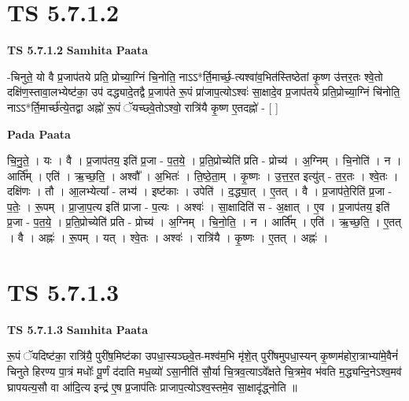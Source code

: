 \documentclass[17pt]{extarticle}
\begin{document}

\section{ TS 5.7.1.2 }

\textbf{TS 5.7.1.2 } \newline
\textbf{Samhita Paata} \newline

-चिनुते॒ यो वै प्र॒जाप॑तये प्रति॒ प्रोच्या॒ग्निं चि॒नोति॒ नाऽऽ*र्ति॒मार्च्छ॒-त्यश्वा॑व॒भित॑स्तिष्ठेतां कृ॒ष्ण उ॑त्तर॒तः श्वे॒तो दक्षि॑ण॒स्तावा॒लभ्येष्ट॑का॒ उप॑ दद्ध्यादे॒तद्वै प्र॒जाप॑ते रू॒पं प्रा॑जाप॒त्योऽश्वः॑ सा॒क्षादे॒व प्र॒जाप॑तये प्रति॒प्रोच्या॒ग्निं चि॑नोति॒ नाऽऽ*र्ति॒मार्च्छ॑त्ये॒तद्वा अह्नो॑ रू॒पं ॅयच्छ्वे॒तोऽश्वो॒ रात्रि॑यै कृ॒ष्ण ए॒तदह्नो॑ - [  ] \newline

\textbf{Pada Paata} \newline

चि॒नु॒ते॒ । यः । वै । प्र॒जाप॑तय॒ इति॑ प्र॒जा -  प॒त॒ये॒ । प्र॒ति॒प्रोच्येति॑ प्रति - प्रोच्य॑ । अ॒ग्निम् । चि॒नोति॑ । न । आर्ति᳚म् । एति॑ । ऋ॒च्छ॒ति॒ । अश्वौ᳚ । अ॒भितः॑ । ति॒ष्ठे॒ता॒म् । कृ॒ष्णः । उ॒त्त॒र॒त इत्यु॑त् -   त॒र॒तः । श्वे॒तः । दक्षि॑णः । तौ । आ॒लभ्येत्या᳚ - लभ्य॑ । इष्ट॑काः । उपेति॑ । द॒द्ध्या॒त् । ए॒तत् । वै । प्र॒जाप॑ते॒रिति॑ प्र॒जा - प॒तेः॒ । रू॒पम् । प्रा॒जा॒प॒त्य इति॑ प्राजा - प॒त्यः । अश्वः॑ । सा॒क्षादिति॑ स - अ॒क्षात् । ए॒व । प्र॒जाप॑तय॒ इति॑ प्र॒जा - प॒त॒ये॒ । प्र॒ति॒प्रोच्येति॑ प्रति - प्रोच्य॑ । अ॒ग्निम् । चि॒नो॒ति॒ । न । आर्ति᳚म् । एति॑ । ऋ॒च्छ॒ति॒ । ए॒तत् । वै । अह्नः॑ । रू॒पम् । यत् । श्वे॒तः । अश्वः॑ । रात्रि॑यै । कृ॒ष्णः । ए॒तत् । अह्नः॑ ।  \newline





\section{ TS 5.7.1.3 }

\textbf{TS 5.7.1.3 } \newline
\textbf{Samhita Paata} \newline

रू॒पं ॅयदिष्ट॑का॒ रात्रि॑यै॒ पुरी॑ष॒मिष्ट॑का उपधा॒स्यञ्छ्वे॒त-मश्व॑म॒भि मृ॑शे॒त् पुरी॑षमुपधा॒स्यन् कृ॒ष्णम॑होरा॒त्राभ्या॑मे॒वैनं॑ चिनुते हिरण्य पा॒त्रं मधोः᳚ पू॒र्णं द॑दाति मध॒व्यो॑ ऽसा॒नीति॑ सौ॒र्या चि॒त्रव॒त्याऽवे᳚क्षते चि॒त्रमे॒व भ॑वति म॒द्ध्यन्दि॒नेऽश्व॒मव॑ घ्रापयत्य॒सौ वा आ॑दि॒त्य इन्द्र॑ ए॒ष प्र॒जाप॑तिः प्राजाप॒त्योऽश्व॒स्तमे॒व सा॒क्षादृ॑द्ध्नोति ॥ \newline
\end{document}
